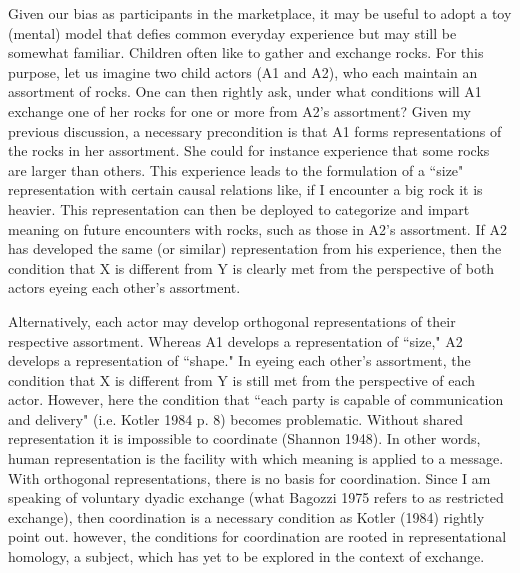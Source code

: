 Given our bias as participants in the marketplace, it may be useful to adopt a toy (mental) model that defies common everyday experience but may still be somewhat familiar. Children often like to gather and exchange rocks. For this purpose, let us imagine two child actors (A1 and A2), who each maintain an assortment of rocks. One can then rightly ask, under what conditions will A1 exchange one of her rocks for one or more from A2's assortment? Given my previous discussion, a necessary precondition is that A1 forms representations of the rocks in her assortment. She could for instance experience that some rocks are larger than others. This experience leads to the formulation of a ``size" representation with certain causal relations like, if I encounter a big rock it is heavier. This representation can then be deployed to categorize and impart meaning on future encounters with rocks, such as those in A2's assortment. If A2 has developed the same (or similar) representation from his experience, then the condition that X is different from Y is clearly met from the perspective of both actors eyeing each other's assortment.

Alternatively, each actor may develop orthogonal representations of their respective assortment. Whereas A1 develops a representation of ``size," A2 develops a representation of ``shape." In eyeing each other's assortment, the condition that X is different from Y is still met from the perspective of each actor. However, here the condition that ``each party is capable of communication and delivery" (i.e. Kotler 1984 p. 8) becomes problematic. Without shared representation it is impossible to coordinate (Shannon 1948). In other words, human representation is the facility with which meaning is applied to a message. With orthogonal representations, there is no basis for coordination. Since I am speaking of voluntary dyadic exchange (what Bagozzi 1975 refers to as restricted exchange), then coordination is a necessary condition as Kotler (1984) rightly point out. however, the conditions for coordination are rooted in representational homology, a subject, which has yet to be explored in the context of exchange.

